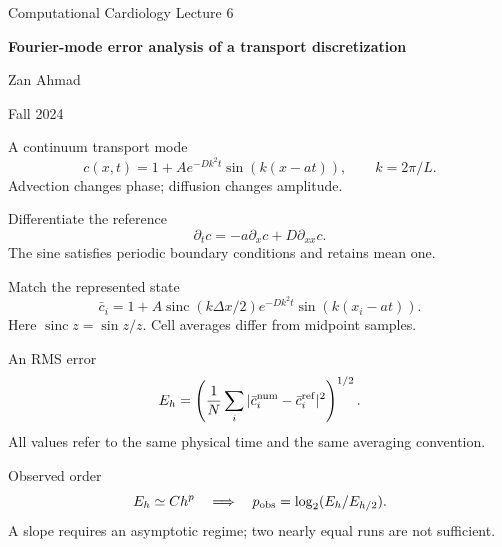 \documentclass[aspectratio=169,11pt]{beamer}
\newcommand{\notestarget}{notes.pdf}\newcommand{\noteslabel}{Notes}
\begin{document}
\begin{frame}[plain]\vfill
{\small\color{accent} Computational Cardiology \quad Lecture 6}\par\medskip
{\raggedright{}\LARGE\bfseries\color{ink} Fourier-mode error analysis of a transport discretization}\par\bigskip
Zan Ahmad\par\smallskip
{\small Fall 2024}\par\vfill\end{frame}
\renewcommand{\notestarget}{notes.pdf\#note-an-exact-periodic-solution-and-its-cell-averages}
\begin{frame}[t,fragile,label=slide-a-continuum-transport-mode]{A continuum transport mode}
\[c(x,t)=1+A e^{-Dk^2t}\sin(k(x-at)),\qquad k=2\pi/L.\]\pause{} Advection changes phase; diffusion changes amplitude.
\end{frame}
\renewcommand{\notestarget}{notes.pdf\#note-an-exact-periodic-solution-and-its-cell-averages}
\begin{frame}[t,fragile,label=slide-differentiate-the-reference]{Differentiate the reference}
\[\partial_t c=-a\partial_x c+D\partial_{xx}c.\]\pause{} The sine satisfies periodic boundary conditions and retains mean one.
\end{frame}
\renewcommand{\notestarget}{notes.pdf\#note-an-exact-periodic-solution-and-its-cell-averages}
\begin{frame}[t,fragile,label=slide-match-the-represented-state]{Match the represented state}
\[\bar c_i=1+A\operatorname{sinc}(k\Delta x/2)e^{-Dk^2t}\sin(k(x_i-at)).\]\pause{} Here $\operatorname{sinc}z=\sin z/z$. Cell averages differ from midpoint samples.
\end{frame}
\renewcommand{\notestarget}{notes.pdf\#note-norms-and-observed-convergence-order}
\begin{frame}[t,fragile,label=slide-an-rms-error]{An RMS error}
\[E_h=\left(\frac1N\sum_i|\bar c_i^{\rm num}-\bar c_i^{\rm ref}|^2\right)^{1/2}.\]\pause{} All values refer to the same physical time and the same averaging convention.
\end{frame}
\renewcommand{\notestarget}{notes.pdf\#note-norms-and-observed-convergence-order}
\begin{frame}[t,fragile,label=slide-observed-order]{Observed order}
\[E_h\simeq Ch^p\quad\Longrightarrow\quad p_{\rm obs}=\log_2(E_h/E_{h/2}).\]\pause{} A slope requires an asymptotic regime; two nearly equal runs are not sufficient.
\end{frame}
\end{document}
